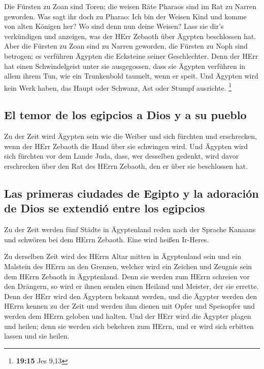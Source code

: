  Die Fürsten zu Zoan sind Toren; die weisen Räte Pharaos
sind im Rat zu Narren geworden. Was sagt ihr doch zu Pharao: Ich bin der
Weisen Kind und komme von alten Königen her?  Wo sind
denn nun deine Weisen? Lass sie dir's verkündigen und anzeigen, was der
HErr Zebaoth über Ägypten beschlossen hat.  Aber die
Fürsten zu Zoan sind zu Narren geworden, die Fürsten zu Noph sind
betrogen; es verführen Ägypten die Ecksteine seiner Geschlechter.
 Denn der HErr hat einen Schwindelgeist unter sie
ausgegossen, dass sie Ägypten verführen in allem ihrem Tun, wie ein
Trunkenbold taumelt, wenn er speit.  Und Ägypten wird
kein Werk haben, das Haupt oder Schwanz, Ast oder Stumpf ausrichte.
\footnote{\textbf{19:15} Jes 9,13}

\hypertarget{el-temor-de-los-egipcios-a-dios-y-a-su-pueblo}{%
\subsection{El temor de los egipcios a Dios y a su
pueblo}\label{el-temor-de-los-egipcios-a-dios-y-a-su-pueblo}}

 Zu der Zeit wird Ägypten sein wie die Weiber und sich
fürchten und erschrecken, wenn der HErr Zebaoth die Hand über sie
schwingen wird.  Und Ägypten wird sich fürchten vor dem
Lande Juda, dass, wer desselben gedenkt, wird davor erschrecken über den
Rat des HErrn Zebaoth, den er über sie beschlossen hat.

\hypertarget{las-primeras-ciudades-de-egipto-y-la-adoraciuxf3n-de-dios-se-extendiuxf3-entre-los-egipcios}{%
\subsection{Las primeras ciudades de Egipto y la adoración de Dios se
extendió entre los
egipcios}\label{las-primeras-ciudades-de-egipto-y-la-adoraciuxf3n-de-dios-se-extendiuxf3-entre-los-egipcios}}

 Zu der Zeit werden fünf Städte in Ägyptenland reden nach
der Sprache Kanaans und schwören bei dem HErrn Zebaoth. Eine wird heißen
Ir-Heres.

 Zu derselben Zeit wird des HErrn Altar mitten in
Ägyptenland sein und ein Malstein des HErrn an den Grenzen,
 welcher wird ein Zeichen und Zeugnis sein dem HErrn
Zebaoth in Ägyptenland. Denn sie werden zum HErrn schreien vor den
Drängern, so wird er ihnen senden einen Heiland und Meister, der sie
errette.  Denn der HErr wird den Ägyptern bekannt werden,
und die Ägypter werden den HErrn kennen zu der Zeit und werden ihm
dienen mit Opfer und Speisopfer und werden dem HErrn geloben und halten.
 Und der HErr wird die Ägypter plagen und heilen; denn
sie werden sich bekehren zum HErrn, und er wird sich erbitten lassen und
sie heilen.


